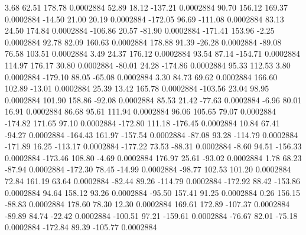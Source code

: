         3.68       62.51      178.78     0.0002884
       52.89       18.12     -137.21     0.0002884
       90.70      156.12      169.37     0.0002884
      -14.50       21.00       20.19     0.0002884
     -172.05       96.69     -111.08     0.0002884
       83.13       24.50      174.84     0.0002884
     -106.86       20.57      -81.90     0.0002884
     -171.41      153.96       -2.25     0.0002884
       92.78       82.09      160.63     0.0002884
      178.88       91.39      -26.28     0.0002884
      -89.08       76.58      103.51     0.0002884
        3.49       24.37      176.12     0.0002884
       93.54       87.14     -154.71     0.0002884
      114.97      176.17       30.80     0.0002884
      -80.01       24.28     -174.86     0.0002884
       95.33      112.53        3.80     0.0002884
     -179.10       88.05      -65.08     0.0002884
        3.30       84.73       69.62     0.0002884
      166.60      102.89      -13.01     0.0002884
       25.39       13.42      165.78     0.0002884
     -103.56       23.04       98.95     0.0002884
      101.90      158.86      -92.08     0.0002884
       85.53       21.42      -77.63     0.0002884
       -6.96       80.01       16.91     0.0002884
       86.68       95.61      111.94     0.0002884
       96.06      105.65       79.07     0.0002884
     -174.82      171.65       97.10     0.0002884
     -172.80      111.18     -176.45     0.0002884
       10.84       67.41      -94.27     0.0002884
     -164.43      161.97     -157.54     0.0002884
      -87.08       93.28     -114.79     0.0002884
     -171.89       16.25     -113.17     0.0002884
     -177.22       73.53      -88.31     0.0002884
       -8.60       94.51     -156.33     0.0002884
     -173.46      108.80       -4.69     0.0002884
      176.97       25.61      -93.02     0.0002884
        1.78       68.23      -87.94     0.0002884
     -172.30       78.45      -14.99     0.0002884
      -98.77      102.53      101.20     0.0002884
       72.84      161.19       63.64     0.0002884
      -82.44       89.26     -114.79     0.0002884
     -172.92       88.42     -153.86     0.0002884
       94.64      158.12       93.26     0.0002884
      -95.50      157.41       91.25     0.0002884
        0.26      156.15      -88.83     0.0002884
      178.60       78.30       12.30     0.0002884
      169.61      172.89     -107.37     0.0002884
      -89.89       84.74      -22.42     0.0002884
     -100.51       97.21     -159.61     0.0002884
      -76.67       82.01      -75.18     0.0002884
     -172.84       89.39     -105.77     0.0002884
